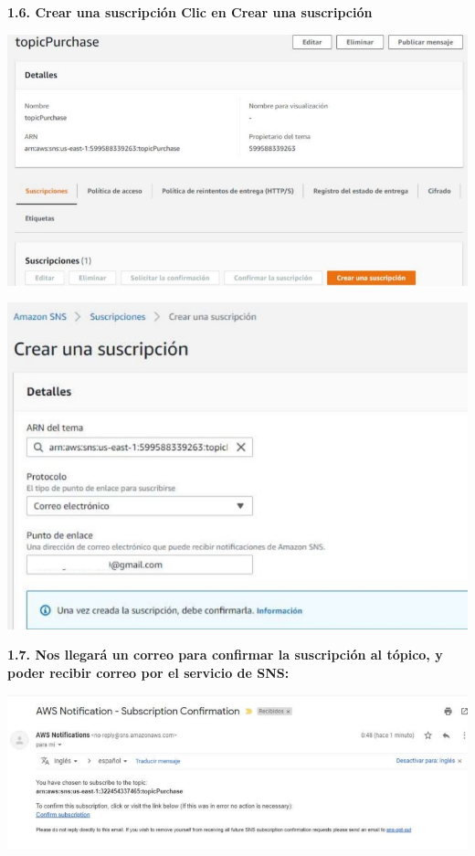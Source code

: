 \documentclass{article}
\begin{document}
	\newpage
\textbf{1.6.   Crear una suscripción
Clic en Crear una suscripción
}

    \begin{center}
		\includegraphics[width=15cm]{./images/5} 
	\end{center}
	 \begin{center}
		\includegraphics[width=15cm]{./images/6} 
	\end{center}
	
	\newpage
\textbf{1.7. Nos llegará un correo para confirmar la suscripción al tópico, y poder recibir correo por el servicio
de SNS:
}

    \begin{center}
		\includegraphics[width=15cm]{./images/7} 
	\end{center}
	
\end{document}
